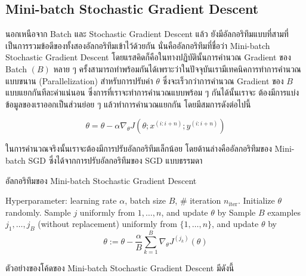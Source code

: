 \subsection{Mini-batch Stochastic Gradient Descent}
\label{ssec:minibatch_grad}

นอกเหนือจาก Batch และ Stochastic Gradient Descent แล้ว ยังมีอัลกอริทึมแบบที่สามที่เป็นการรวมข้อดีของทั้งสองอัลกอริทึมเข้าไว้ด้วยกัน
นั่นคืออัลกอริทึมที่ชื่อว่า Mini-batch Stochastic Gradient Descent โดยแรสคิดก็คือในทางปฏิบัตินั้นการคำนวณ Gradient ของ Batch 
$(B)$ หลาย ๆ ครั้งสามารถทำพร้อมกันได้เพราะว่าในปัจจุบันเรามีเทคนิคการทำการคำนวณแบบขนาน (Parallelization) สำหรับการปรับค่า 
$\theta$ ซึ่งจะเร็วกว่าการคำนวณ Gradient ของ $B$ แบบแยกกันทีละค่าแน่นอน ซึ่งการที่เราจะทำการคำนวณแบบพร้อม ๆ กันได้นั้นเราจะ%
ต้องมีการแบ่งข้อมูลของเราออกเป็นส่วนย่อย ๆ แล้วทำการคำนวณแยกกัน โดยมีสมการดังต่อไปนี้ 

\begin{equation}\label{eq:minibatch}
    \theta = \theta - \alpha\nabla_\theta J( \theta; x^{(i:i+n)}; y^{(i:i+n)})
\end{equation}

ในการคำนวณจริงนั้นเราจะต้องมีการปรับอัลกอริทึมเล็กน้อย โดยด้านล่างคืออัลกอริทึมของ Mini-batch SGD ซึ่งได้จากการปรับอัลกอริทึมของ SGD 
แบบธรรมดา

\begin{algorithm}[H]
    \caption{อัลกอริทึมของ Mini-batch Stochastic Gradient Descent}
    \label{alg:minibatch}
    \begin{algorithmic}
    \State Hyperparameter: learning rate $\alpha$, batch size $B$, \# iteration $n_\text{iter}$.
    \State Initialize $\theta$ randomly.
        \State Sample $j$ uniformly from ${1,\ldots,n}$, and update $\theta$ by
        \State Sample $B$ examples $j_1,\ldots,j_B$ (without replacement) uniformly from $\{1,\ldots,n\}$, 
        and update $\theta$ by
        \begin{equation*}
            \theta := \theta - \frac{\alpha}{B}\sum_{k=1}^B\nabla_\theta J^{(j_k)}(\theta)
        \end{equation*}
    \EndFor
    \end{algorithmic}
\end{algorithm}

\noindent ตัวอย่างของโค้ดของ Mini-batch Stochastic Gradient Descent มีดังนี้

